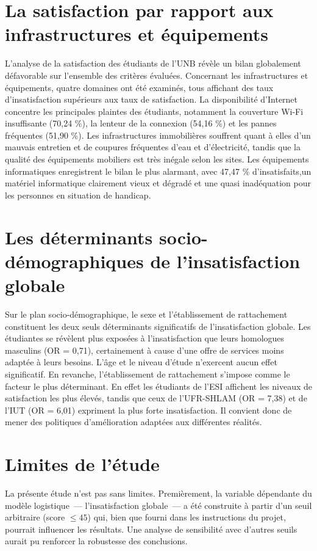 \documentclass[
12pt,          %
a4paper,       %
oneside,      %
openright      %
]{report}          %
\begin{document}
		
		\section{La satisfaction par rapport aux infrastructures et équipements}
		L'analyse de la satisfaction des étudiants de l'UNB révèle un bilan globalement défavorable sur l'ensemble des critères évaluées. Concernant les infrastructures et équipements, quatre domaines ont été examinés, tous affichant des taux d'insatisfaction supérieurs aux taux de satisfaction. La disponibilité d'Internet concentre les principales plaintes des étudiants, notamment la couverture Wi-Fi insuffisante (70,24 \%), la lenteur de la connexion (54,16 \%) et les pannes fréquentes (51,90 \%). Les infrastructures immobilières souffrent quant à elles d'un mauvais entretien et de coupures fréquentes d'eau et d'électricité, tandis que la qualité des équipements mobiliers est très inégale selon les sites. Les équipements informatiques enregistrent le bilan le plus alarmant, avec 47,47 \% d'insatisfaits,un matériel informatique clairement vieux et dégradé et une quasi inadéquation pour les personnes en situation de handicap.
		
		\section{Les déterminants socio-démographiques de l'insatisfaction globale}
		
		Sur le plan socio-démographique, le sexe et l'établissement de rattachement constituent les deux seuls déterminants significatifs de l'insatisfaction globale. Les étudiantes se révèlent plus exposées à l'insatisfaction que leurs homologues masculins (OR = 0,71), certainement à cause d'une offre de services moins adaptée à leurs besoins. L'âge et le niveau d'étude n'exercent aucun effet significatif. En revanche, l'établissement de rattachement s'impose comme le facteur le plus déterminant. En effet les étudiants de l'ESI affichent les niveaux de satisfaction les plus élevés, tandis que ceux de l'UFR-SHLAM (OR = 7,38) et de l'IUT (OR = 6,01) expriment la plus forte insatisfaction. Il convient donc de mener des politiques d'amélioration adaptées aux différentes réalités.
		
		\section{Limites de l'étude}
		
		La présente étude n'est pas sans limites. Premièrement, la variable dépendante du modèle
		logistique~--- l'insatisfaction globale~--- a été construite à partir d'un seuil arbitraire
		(score $\leq 45$) qui, bien que fourni dans les instructions du projet, pourrait influencer
		les résultats. Une analyse de sensibilité avec d'autres seuils aurait pu renforcer la
		robustesse des conclusions.
		
\end{document}
